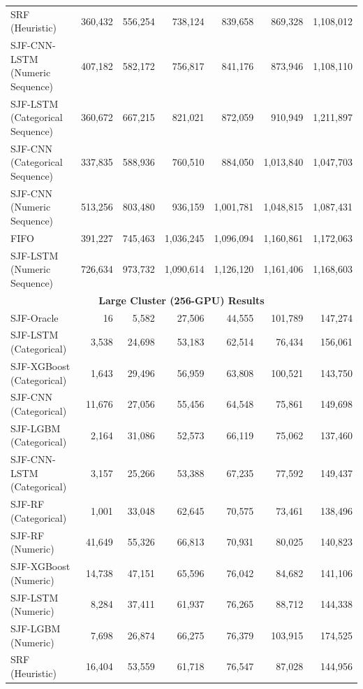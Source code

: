 \begin{table}[htbp]
{\begin{tabular}{lrrrrrr}
SRF (Heuristic) & 360{,}432 & 556{,}254 & 738{,}124 & 839{,}658 & 869{,}328 & 1{,}108{,}012 \\
SJF-CNN-LSTM (Numeric Sequence) & 407{,}182 & 582{,}172 & 756{,}817 & 841{,}176 & 873{,}946 & 1{,}108{,}110 \\
SJF-LSTM (Categorical Sequence) & 360{,}672 & 667{,}215 & 821{,}021 & 872{,}059 & 910{,}949 & 1{,}211{,}897 \\
SJF-CNN (Categorical Sequence) & 337{,}835 & 588{,}936 & 760{,}510 & 884{,}050 & 1{,}013{,}840 & 1{,}047{,}703 \\
SJF-CNN (Numeric Sequence) & 513{,}256 & 803{,}480 & 936{,}159 & 1{,}001{,}781 & 1{,}048{,}815 & 1{,}087{,}431 \\
FIFO & 391{,}227 & 745{,}463 & 1{,}036{,}245 & 1{,}096{,}094 & 1{,}160{,}861 & 1{,}172{,}063 \\
SJF-LSTM (Numeric Sequence) & 726{,}634 & 973{,}732 & 1{,}090{,}614 & 1{,}126{,}120 & 1{,}161{,}406 & 1{,}168{,}603 \\
\hline\hline
\multicolumn{7}{c}{\textbf{Large Cluster (256-GPU) Results}} \\
\hline
SJF-Oracle & 16 & 5{,}582 & 27{,}506 & 44{,}555 & 101{,}789 & 147{,}274 \\
SJF-LSTM (Categorical) & 3{,}538 & 24{,}698 & 53{,}183 & 62{,}514 & 76{,}434 & 156{,}061 \\
SJF-XGBoost (Categorical) & 1{,}643 & 29{,}496 & 56{,}959 & 63{,}808 & 100{,}521 & 143{,}750 \\
SJF-CNN (Categorical) & 11{,}676 & 27{,}056 & 55{,}456 & 64{,}548 & 75{,}861 & 149{,}698 \\
SJF-LGBM (Categorical) & 2{,}164 & 31{,}086 & 52{,}573 & 66{,}119 & 75{,}062 & 137{,}460 \\
SJF-CNN-LSTM (Categorical) & 3{,}157 & 25{,}266 & 53{,}388 & 67{,}235 & 77{,}592 & 149{,}437 \\
SJF-RF (Categorical) & 1{,}001 & 33{,}048 & 62{,}645 & 70{,}575 & 73{,}461 & 138{,}496 \\
SJF-RF (Numeric) & 41{,}649 & 55{,}326 & 66{,}813 & 70{,}931 & 80{,}025 & 140{,}823 \\
SJF-XGBoost (Numeric) & 14{,}738 & 47{,}151 & 65{,}596 & 76{,}042 & 84{,}682 & 141{,}106 \\
SJF-LSTM (Numeric) & 8{,}284 & 37{,}411 & 61{,}937 & 76{,}265 & 88{,}712 & 144{,}338 \\
SJF-LGBM (Numeric) & 7{,}698 & 26{,}874 & 66{,}275 & 76{,}379 & 103{,}915 & 174{,}525 \\
SRF (Heuristic) & 16{,}404 & 53{,}559 & 61{,}718 & 76{,}547 & 87{,}028 & 144{,}956 \\

\end{tabular}}
\end{table}
